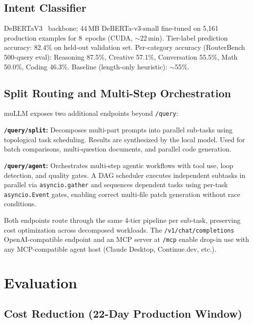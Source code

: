 \documentclass[11pt]{article}
\begin{document}
\subsection{Intent Classifier}

DeBERTaV3~\cite{he2021debertav3} backbone; 44\,MB DeBERTa-v3-small
fine-tuned on 5,161 production examples for 8~epochs (CUDA, $\sim$22\,min).
Tier-label prediction accuracy: 82.4\% on held-out validation set.
Per-category accuracy (RouterBench 500-query eval): Reasoning 87.5\%,
Creative 57.1\%, Conversation 55.5\%, Math 50.0\%, Coding 46.3\%.
Baseline (length-only heuristic): $\sim$55\%.

\subsection{Split Routing and Multi-Step Orchestration}

muLLM exposes two additional endpoints beyond \texttt{/query}:

\textbf{\texttt{/query/split}:} Decomposes multi-part prompts into
parallel sub-tasks using topological task scheduling. Results are
synthesized by the local model. Used for batch comparisons,
multi-question documents, and parallel code generation.

\textbf{\texttt{/query/agent}:} Orchestrates multi-step agentic
workflows with tool use, loop detection, and quality gates. A DAG
scheduler executes independent subtasks in parallel via
\texttt{asyncio.gather} and sequences dependent tasks using
per-task \texttt{asyncio.Event} gates, enabling correct multi-file
patch generation without race conditions.

Both endpoints route through the same 4-tier pipeline per sub-task,
preserving cost optimization across decomposed workloads. The
\texttt{/v1/chat/completions} OpenAI-compatible endpoint and an MCP
server at \texttt{/mcp} enable drop-in use with any MCP-compatible
agent host (Claude Desktop, Continue.dev, etc.).

\section{Evaluation}

\subsection{Cost Reduction (22-Day Production Window)}
\end{document}
